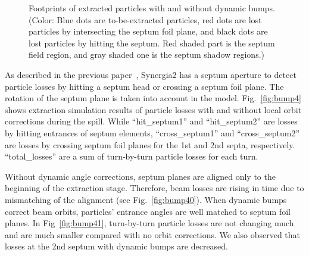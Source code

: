\documentclass[aps,prstab,onecolumn,preprint,endfloats,11pt]{revtex4-1}
\begin{document}
\begin{figure}[!tbp]
  \caption{\label{fig:bump3}Footprints of extracted particles with and without dynamic bumps. (Color: Blue dots are to-be-extracted particles, red dots are lost particles by intersecting the septum foil plane, and black dots are lost particles by hitting the septum. Red shaded part is the septum field region, and gray shaded one is the septum shadow regions.)}
\end{figure}

As described in the previous paper~\cite{mu2e}, Synergia2 has a septum aperture to detect particle losses by hitting a septum head or crossing a septum foil plane.
The rotation of the septum plane is taken into account in the model.
Fig.~\ref{fig:bump4} shows extraction simulation results of particle losses with and without local orbit corrections during the spill.
While ``hit\_septum1'' and ``hit\_septum2'' are losses by hitting entrances of septum elements, ``cross\_septum1'' and ``cross\_septum2'' are losses by crossing septum foil planes for the 1st and 2nd septa, respectively.
``total\_losses'' are a sum of turn-by-turn particle losses for each turn.

Without dynamic angle corrections, septum planes are aligned only to the beginning of the extraction stage.
Therefore, beam losses are rising in time due to mismatching of the alignment (see Fig.~\ref{fig:bump40}).
When dynamic bumps correct beam orbits, particles' entrance angles are well matched to septum foil planes.
In Fig~\ref{fig:bump41}, turn-by-turn particle losses are not changing much and are much smaller compared with no orbit corrections.
We also observed that losses at the 2nd septum with dynamic bumps are decreased.
\end{document}
